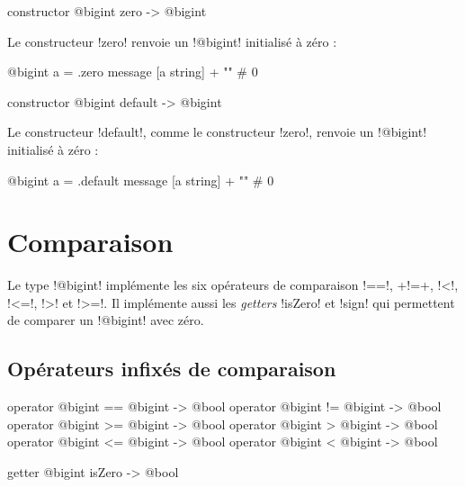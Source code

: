 
\begin{galgasbox}
constructor @bigint zero -> @bigint
\end{galgasbox}

Le constructeur \ggs!zero! renvoie un \ggs!@bigint! initialisé à zéro :
\begin{galgas}
@bigint a = .zero
message [a string] + "\n" # 0
\end{galgas}



\begin{galgasbox}
constructor @bigint default -> @bigint
\end{galgasbox}

Le constructeur \ggs!default!, comme le constructeur \ggs!zero!, renvoie un \ggs!@bigint! initialisé à zéro :
\begin{galgas}
@bigint a = .default
message [a string] + "\n" # 0
\end{galgas}











\section{Comparaison}

Le type \ggs!@bigint! implémente les six opérateurs de comparaison \ggs!==!, \ggs+!=+, \ggs!<!, \ggs!<=!, \ggs!>! et \ggs!>=!. Il implémente aussi les \emph{getters} \ggs!isZero! et \ggs!sign! qui permettent de comparer un \ggs!@bigint! avec zéro.

\subsection{Opérateurs infixés de comparaison}

\begin{galgasbox}
operator @bigint == @bigint -> @bool
operator @bigint != @bigint -> @bool
operator @bigint >= @bigint -> @bool
operator @bigint >  @bigint -> @bool
operator @bigint <= @bigint -> @bool
operator @bigint <  @bigint -> @bool
\end{galgasbox}


\begin{galgasbox}
getter @bigint isZero -> @bool
\end{galgasbox}

